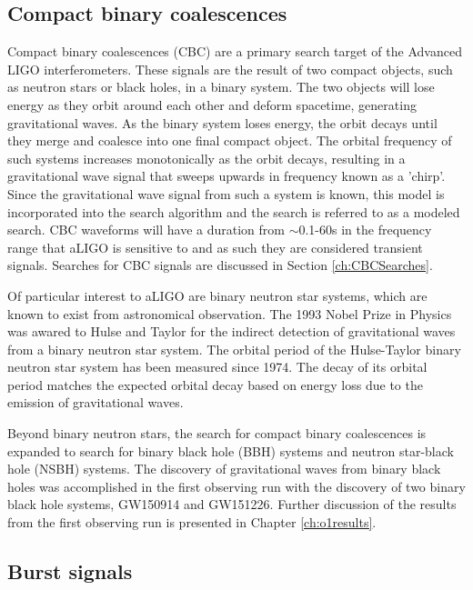 \subsection{Compact binary coalescences}

Compact binary coalescences (CBC) are a primary search target of the 
Advanced LIGO interferometers. These signals are the result of two 
compact objects, such as neutron stars or black holes, in a binary 
system. The two objects will lose energy as they orbit around each other 
and deform spacetime, generating gravitational waves. As the binary 
system loses energy, the orbit decays until they merge and coalesce 
into one final 
compact object. The orbital frequency of such systems increases 
monotonically as the orbit decays, resulting in a gravitational 
wave signal that sweeps upwards in frequency known as a 'chirp'. 
Since the gravitational wave signal from such a system is known, 
this model is incorporated into the search algorithm and the 
search is referred to as a modeled search. CBC waveforms will 
have a duration from $\sim$0.1-60s in the frequency range that
aLIGO is sensitive to and as such they are considered transient 
signals. Searches for CBC 
signals are discussed in Section \ref{ch:CBCSearches}.

Of particular interest to aLIGO are binary neutron star systems, 
which are known to exist from astronomical 
observation. The 1993 Nobel Prize in Physics was awared to Hulse and 
Taylor for the indirect detection of gravitational waves from a binary 
neutron star system. The orbital 
period of the Hulse-Taylor binary neutron star system has been measured 
since 1974. The decay of its orbital period matches the 
expected orbital decay based on energy loss due to the emission of 
gravitational waves. 

Beyond binary neutron stars, the search for compact binary coalescences 
is expanded to search for binary black hole (BBH) systems and neutron star-black 
hole (NSBH) systems. The discovery of gravitational waves from binary black holes 
was accomplished in the 
first observing run with the discovery of two binary black hole systems, GW150914 
and GW151226. Further discussion of the results from the first observing run is 
presented in Chapter \ref{ch:o1results}.

\subsection{Burst signals}

